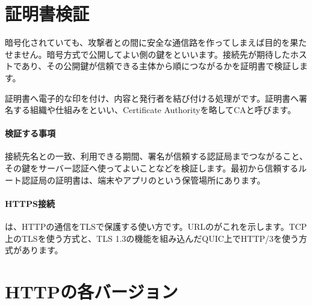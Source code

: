 \par
\endgroup


\section{証明書検証}
\label{sec:05-network-17}

暗号化されていても、攻撃者との間に安全な通信路を作ってしまえば目的を果たせません。暗号方式で公開してよい側の鍵をといいます。接続先が期待したホストであり、その公開鍵が信頼できる主体から順につながるかを証明書で検証します。

証明書へ電子的な印を付け、内容と発行者を結び付ける処理がです。証明書へ署名する組織や仕組みをといい、Certificate Authorityを略してCAと呼びます。

\begingroup
  \centering
  \vspace{4mm}
\begingroup
\paragraph{検証する事項}
        接続先名との一致、利用できる期間、署名が信頼する認証局までつながること、その鍵をサーバー認証へ使ってよいことなどを検証します。最初から信頼するルート認証局の証明書は、端末やアプリのという保管場所にあります。

\par
\endgroup
\medskip
\begingroup
\paragraph{HTTPS接続}
        は、HTTPの通信をTLSで保護する使い方です。URLのがこれを示します。TCP上のTLSを使う方式と、TLS 1.3の機能を組み込んだQUIC上でHTTP/3を使う方式があります。

\par
\endgroup
\par
\endgroup


\section{HTTPの各バージョン}
\label{sec:05-network-18}

